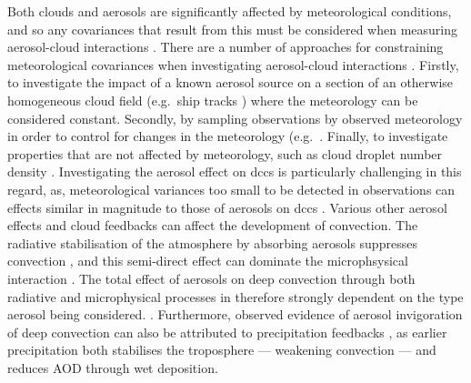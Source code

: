 Both clouds and aerosols are significantly affected by meteorological conditions, and so any covariances that result from this must be considered when measuring aerosol-cloud interactions \citep{gryspeerdt_satellite_2014}.
There are a number of approaches for constraining meteorological covariances when investigating aerosol-cloud interactions \citep{quaas_approaches_2015}.
Firstly, to investigate the impact of a known aerosol source on a section of an otherwise homogeneous cloud field (e.g.\ ship tracks \citep{christensen_ship_2014}) where the meteorology can be considered constant. 
Secondly, by sampling observations by observed meteorology in order to control for changes in the meteorology (e.g.\ \citep{eastman_competing_2018, gryspeerdt_satellite_2014}.
Finally, to investigate properties that are not affected by meteorology, such as cloud droplet number density \citep{gryspeerdt_constraining_2019}. 
Investigating the aerosol effect on \acrshort{dcc}s is particularly challenging in this regard, as, meteorological variances too small to be detected in observations can effects similar in magnitude to those of aerosols on \acrshort{dcc}s \citep{grabowski_can_2018}.
Various other aerosol effects and cloud feedbacks can affect the development of convection.
The radiative stabilisation of the atmosphere by absorbing aerosols suppresses convection \citep{koren_smoke_2008}, and this semi-direct effect can dominate the microphsysical interaction \citep{fan_effects_2008}.
The total effect of aerosols on deep convection through both radiative and microphysical processes in therefore strongly dependent on the type aerosol being considered. \citep{jiang_contrasting_2018}.
Furthermore, observed evidence of aerosol invigoration of deep convection can also be attributed to precipitation feedbacks \citep{varble_erroneous_2018}, as earlier precipitation both stabilises the troposphere --- weakening convection --- and reduces AOD through wet deposition. 


